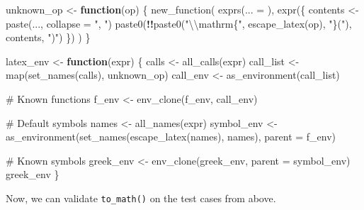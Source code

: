 \documentclass[
]{krantz}
\makeatletter
\newenvironment{Shaded}{\begin{snugshade}}{\end{snugshade}}
\newcommand{\CharTok}[1]{\textcolor[rgb]{0.31,0.60,0.02}{#1}}
\newcommand{\CommentTok}[1]{\textcolor[rgb]{0.56,0.35,0.01}{\textit{#1}}}
\newcommand{\ControlFlowTok}[1]{\textcolor[rgb]{0.13,0.29,0.53}{\textbf{#1}}}
\newcommand{\DataTypeTok}[1]{\textcolor[rgb]{0.13,0.29,0.53}{#1}}
\newcommand{\KeywordTok}[1]{\textcolor[rgb]{0.13,0.29,0.53}{\textbf{#1}}}
\newcommand{\NormalTok}[1]{#1}
\newcommand{\OperatorTok}[1]{\textcolor[rgb]{0.81,0.36,0.00}{\textbf{#1}}}
\newcommand{\StringTok}[1]{\textcolor[rgb]{0.31,0.60,0.02}{#1}}
\newenvironment{kframe}{%
\medskip{}
\setlength{\fboxsep}{.8em}
 \def\at@end@of@kframe{}%
 \ifinner\ifhmode%
  \def\at@end@of@kframe{\end{minipage}}%
  \begin{minipage}{\columnwidth}%
 \fi\fi%
 \def\FrameCommand##1{\hskip\@totalleftmargin \hskip-\fboxsep
 \colorbox{shadecolor}{##1}\hskip-\fboxsep
     \hskip-\linewidth \hskip-\@totalleftmargin \hskip\columnwidth}%
 \MakeFramed {\advance\hsize-\width
   \@totalleftmargin\z@ \linewidth\hsize
   \@setminipage}}%
 {\par\unskip\endMakeFramed%
 \at@end@of@kframe}
\renewenvironment{Shaded}{\begin{kframe}}{\end{kframe}}
\renewcommand{\KeywordTok} [1]{\textcolor[rgb]{0.00,0.44,0.13}{{#1}}}
\renewcommand{\DataTypeTok}[1]{\textcolor[rgb]{0.56,0.13,0.00}{{#1}}}
\renewcommand{\CharTok}    [1]{\textcolor[rgb]{0.25,0.44,0.63}{{#1}}}
\renewcommand{\StringTok}  [1]{\textcolor[rgb]{0.25,0.44,0.63}{{#1}}}
\renewcommand{\CommentTok} [1]{\textcolor[rgb]{0.38,0.63,0.69}{{#1}}}
\renewcommand{\NormalTok}  [1]{{#1}}
\makeatother
\begin{document}
\begin{Shaded}
\begin{Highlighting}[]
\NormalTok{unknown_op <-}\StringTok{ }\ControlFlowTok{function}\NormalTok{(op) \{}
  \KeywordTok{new_function}\NormalTok{(}
    \KeywordTok{exprs}\NormalTok{(}\DataTypeTok{... =}\NormalTok{ ),}
    \KeywordTok{expr}\NormalTok{(\{}
\NormalTok{      contents <-}\StringTok{ }\KeywordTok{paste}\NormalTok{(..., }\DataTypeTok{collapse =} \StringTok{", "}\NormalTok{)}
      \KeywordTok{paste0}\NormalTok{(}\OperatorTok{!!}\KeywordTok{paste0}\NormalTok{(}\StringTok{"}\CharTok{\textbackslash{}\textbackslash{}}\StringTok{mathrm\{"}\NormalTok{, }\KeywordTok{escape_latex}\NormalTok{(op), }\StringTok{"\}("}\NormalTok{), contents, }\StringTok{")"}\NormalTok{)}
\NormalTok{    \})}
\NormalTok{  )}
\NormalTok{\}}

\NormalTok{latex_env <-}\StringTok{ }\ControlFlowTok{function}\NormalTok{(expr) \{}
\NormalTok{  calls <-}\StringTok{ }\KeywordTok{all_calls}\NormalTok{(expr)}
\NormalTok{  call_list <-}\StringTok{ }\KeywordTok{map}\NormalTok{(}\KeywordTok{set_names}\NormalTok{(calls), unknown_op)}
\NormalTok{  call_env <-}\StringTok{ }\KeywordTok{as_environment}\NormalTok{(call_list)}
  
  \CommentTok{# Known functions}
\NormalTok{  f_env <-}\StringTok{ }\KeywordTok{env_clone}\NormalTok{(f_env, call_env)}
  
  \CommentTok{# Default symbols}
\NormalTok{  names <-}\StringTok{ }\KeywordTok{all_names}\NormalTok{(expr)}
\NormalTok{  symbol_env <-}\StringTok{ }\KeywordTok{as_environment}\NormalTok{(}\KeywordTok{set_names}\NormalTok{(}\KeywordTok{escape_latex}\NormalTok{(names), names),}
                               \DataTypeTok{parent =}\NormalTok{ f_env)}
  
  \CommentTok{# Known symbols}
\NormalTok{  greek_env <-}\StringTok{ }\KeywordTok{env_clone}\NormalTok{(greek_env, }\DataTypeTok{parent =}\NormalTok{ symbol_env)}
\NormalTok{  greek_env}
\NormalTok{\}}
\end{Highlighting}
\end{Shaded}

Now, we can validate \texttt{to\_math()} on the test cases from above.

\begin{Shaded}
\end{Shaded}
\end{document}
